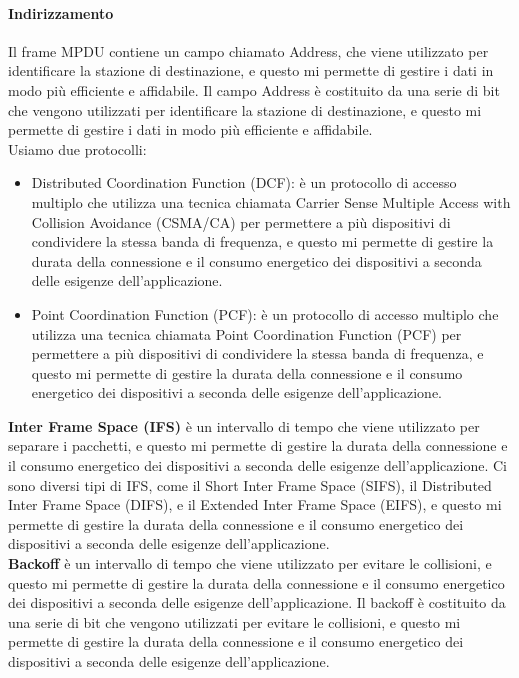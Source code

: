 \paragraph{Indirizzamento}
Il frame MPDU contiene un campo chiamato Address, che viene utilizzato per identificare la stazione di destinazione, e questo mi permette di gestire i dati in modo più efficiente e affidabile. Il campo Address è costituito da una serie di bit che vengono utilizzati per identificare la stazione di destinazione, e questo mi permette di gestire i dati in modo più efficiente e affidabile.\\
Usiamo due protocolli: 
\begin{itemize}
    \item Distributed Coordination Function (DCF): è un protocollo di accesso multiplo che utilizza una tecnica chiamata Carrier Sense Multiple Access with Collision Avoidance (CSMA/CA) per permettere a più dispositivi di condividere la stessa banda di frequenza, e questo mi permette di gestire la durata della connessione e il consumo energetico dei dispositivi a seconda delle esigenze dell'applicazione.
    \item Point Coordination Function (PCF): è un protocollo di accesso multiplo che utilizza una tecnica chiamata Point Coordination Function (PCF) per permettere a più dispositivi di condividere la stessa banda di frequenza, e questo mi permette di gestire la durata della connessione e il consumo energetico dei dispositivi a seconda delle esigenze dell'applicazione.
\end{itemize}

\textbf{Inter Frame Space (IFS)} è un intervallo di tempo che viene utilizzato per separare i pacchetti, e questo mi permette di gestire la durata della connessione e il consumo energetico dei dispositivi a seconda delle esigenze dell'applicazione. Ci sono diversi tipi di IFS, come il Short Inter Frame Space (SIFS), il Distributed Inter Frame Space (DIFS), e il Extended Inter Frame Space (EIFS), e questo mi permette di gestire la durata della connessione e il consumo energetico dei dispositivi a seconda delle esigenze dell'applicazione.\\

\textbf{Backoff} è un intervallo di tempo che viene utilizzato per evitare le collisioni, e questo mi permette di gestire la durata della connessione e il consumo energetico dei dispositivi a seconda delle esigenze dell'applicazione. Il backoff è costituito da una serie di bit che vengono utilizzati per evitare le collisioni, e questo mi permette di gestire la durata della connessione e il consumo energetico dei dispositivi a seconda delle esigenze dell'applicazione.\\

